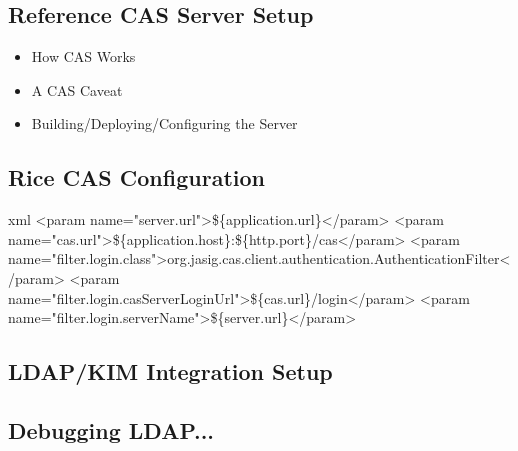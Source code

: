 \documentclass[12pt,notitlepage]{article}
\begin{document}
\begin{s5presentation}
%
%
  \W \begin{s5slide}
    \section{Reference CAS Server Setup}
    \begin{itemize}
      \item How CAS Works
      \item A CAS Caveat
      \item Building/Deploying/Configuring the Server
      \end{itemize}
    
    \W \end{s5slide}

%
%
  \W \begin{s5slide}
    \section{Rice CAS Configuration}

    \begin{code}{xml}
  <param name="server.url">\$\{application.url\}</param>
  <param name="cas.url">\$\{application.host\}:\$\{http.port\}/cas</param>
  <param name="filter.login.class">org.jasig.cas.client.authentication.AuthenticationFilter</param>
  <param name="filter.login.casServerLoginUrl">\$\{cas.url\}/login</param>
  <param name="filter.login.serverName">\$\{server.url\}</param>
    \end{code}
    
    \W \end{s5slide}


%
%
  \W \begin{s5slide}
    \section{LDAP/KIM Integration Setup}

    \W \end{s5slide}

%
%
  \W \begin{s5slide}
    \section{Debugging LDAP...}


\end{s5slide}
\end{s5presentation}
\end{document}
